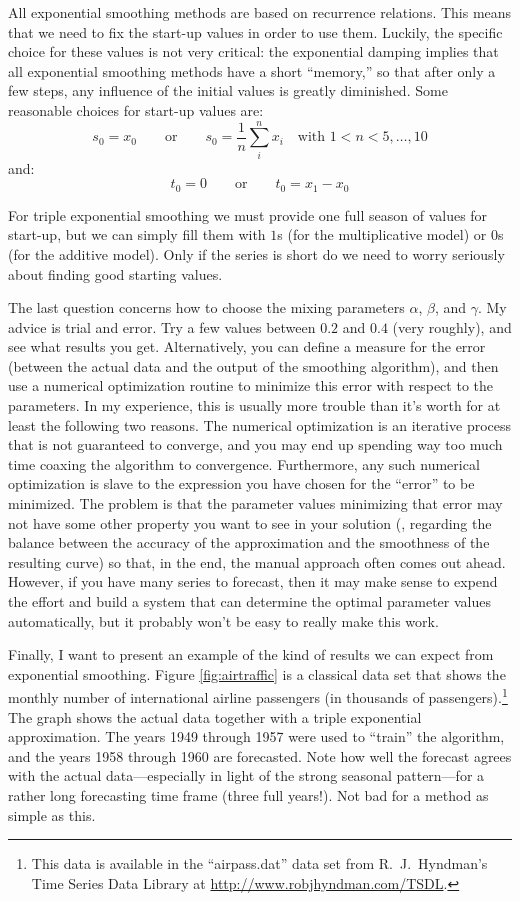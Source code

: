All exponential smoothing methods are based on recurrence relations.
This means that we need to fix the start-up values in order to use
them.  Luckily, the specific choice for these values is not very
critical: the exponential damping implies that all exponential
smoothing methods have a short ``memory,'' so that after only a few
steps, any influence of the initial values is greatly diminished. Some
reasonable choices for start-up values are:
%
\[
s_0 = x_0  
\qquad \text{or} \qquad
s_0 = \frac{1}{n} \sum_i^n x_i \quad \text{with $1 < n < 5, \dots, 10$}
\]
%
and:
%
\[
t_0 = 0 
\qquad \text{or} \qquad
t_0 = x_1 - x_0
\]

For triple exponential smoothing we must provide one full season of
values for start-up, but we can simply fill them with $1$s (for the
multiplicative model) or $0$s (for the additive model). Only if the
series is short do we need to worry seriously about finding good
starting values.

The last question concerns how to choose the mixing parameters
$\alpha$, $\beta$, and $\gamma$. My advice is trial and error. Try a
few values between $0.2$ and $0.4$ (very roughly), and see what results
you get.  Alternatively, you can define a measure for the error
(between the actual data and the output of the smoothing algorithm),
and then use a numerical optimization routine to minimize this error
with respect to the parameters. In my experience, this is usually more
trouble than it's worth for at least the following two reasons. The
numerical optimization is an iterative process that is not guaranteed
to converge, and you may end up spending way too much time coaxing the
algorithm to convergence. Furthermore, any such numerical optimization
is slave to the expression you have chosen for the ``error'' to be
minimized. The problem is that the parameter values minimizing that
error may not have some other property you want to see in your
solution (\eg, regarding the balance between the accuracy of the
approximation and the smoothness of the resulting curve) so that, in
the end, the manual approach often comes out ahead. However, if you
have many series to forecast, then it may make sense to expend the
effort and build a system that can determine the optimal parameter
values automatically, but it probably won't be easy to really make
this work.

Finally, I want to present an example of the kind of results we can
expect from exponential smoothing. Figure \ref{fig:airtraffic} is a
classical data set that shows the monthly number of international
airline passengers (in thousands of passengers).\footnote{This data is
  available in the ``airpass.dat'' data set from R.\ J.\ Hyndman's
  Time Series Data Library at \url{http://www.robjhyndman.com/TSDL}.}
The graph shows the actual data together with a triple exponential
approximation. The years 1949 through 1957 were used to ``train'' the
algorithm, and the years 1958 through 1960 are forecasted.  Note how
well the forecast agrees with the actual data---especially in  
light of the strong seasonal pattern---for a rather long forecasting
time frame (three full years!). Not bad for a method as simple as
this.

